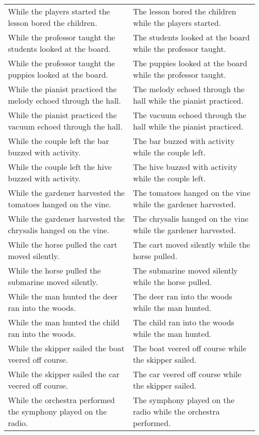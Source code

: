 \begin{center}
\begin{xtabular*}{\textwidth}{p{0.45\textwidth}|p{0.45\textwidth}}
        While the players started the lesson bored the children. & The lesson bored the children while the players started. \\
        While the professor taught the students looked at the board. & The students looked at the board while the professor taught. \\
        While the professor taught the puppies looked at the board. & The puppies looked at the board while the professor taught. \\
        While the pianist practiced the melody echoed through the hall. & The melody echoed through the hall while the pianist practiced. \\
        While the pianist practiced the vacuum echoed through the hall. & The vacuum echoed through the hall while the pianist practiced. \\
        While the couple left the bar buzzed with activity. & The bar buzzed with activity while the couple left. \\
        While the couple left the hive buzzed with activity. & The hive buzzed with activity while the couple left. \\
        While the gardener harvested the tomatoes hanged on the vine. & The tomatoes hanged on the vine while the gardener harvested. \\
        While the gardener harvested the chrysalis hanged on the vine. & The chrysalis hanged on the vine while the gardener harvested. \\
        While the horse pulled the cart moved silently. & The cart moved silently while the horse pulled. \\
        While the horse pulled the submarine moved silently. & The submarine moved silently while the horse pulled. \\
        While the man hunted the deer ran into the woods. & The deer ran into the woods while the man hunted. \\
        While the man hunted the child ran into the woods. & The child ran into the woods while the man hunted. \\
        While the skipper sailed the boat veered off course. & The boat veered off course while the skipper sailed. \\
        While the skipper sailed the car veered off course. & The car veered off course while the skipper sailed. \\
        While the orchestra performed the symphony played on the radio. & The symphony played on the radio while the orchestra performed. \\

\end{xtabular*}
\end{center}
